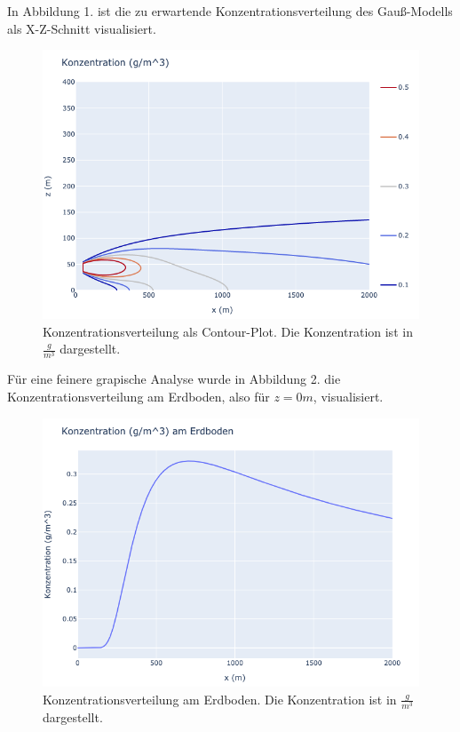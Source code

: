 \documentclass[ngerman]{scrartcl}
\begin{document}
In Abbildung 1. ist die zu erwartende Konzentrationsverteilung des Gauß-Modells als X-Z-Schnitt visualisiert.
\begin{figure}[H]
	\centering
	\includegraphics[scale=0.5]{Bilder/1a.png}
	\caption{Konzentrationsverteilung als Contour-Plot. Die Konzentration ist in $\frac{\si{g}}{\si{m^3}}$ dargestellt. }
	\label{fig:my_label}
\end{figure}

Für eine feinere grapische Analyse wurde in Abbildung 2. die Konzentrationsverteilung am Erdboden, also für $z=0\si{m}$, visualisiert.
\begin{figure}[H]
	\centering
	\includegraphics[scale=0.5]{Bilder/1b.png}
	\caption{Konzentrationsverteilung am Erdboden.  Die Konzentration ist in $\frac{\si{g}}{\si{m^3}}$ dargestellt.}
	\label{fig:my_label}
\end{figure}
\end{document}
